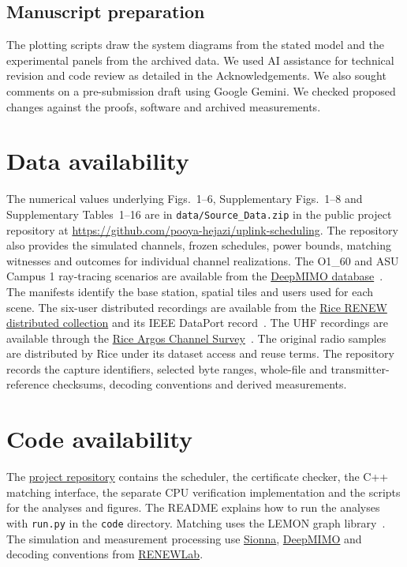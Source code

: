 \subsection*{Manuscript preparation}
The plotting scripts draw the system diagrams from the stated model and the experimental panels from the archived data. We used AI assistance for technical revision and code review as detailed in the Acknowledgements. We also sought comments on a pre-submission draft using Google Gemini. We checked proposed changes against the proofs, software and archived measurements.

\section*{Data availability}
The numerical values underlying Figs.~1--6, Supplementary Figs.~1--8 and Supplementary Tables~1--16 are in \nolinkurl{data/Source_Data.zip} in the public project repository at \url{https://github.com/pooya-hejazi/uplink-scheduling}. The repository also provides the simulated channels, frozen schedules, power bounds, matching witnesses and outcomes for individual channel realizations. The O1\_60 and ASU Campus 1 ray-tracing scenarios are available from the \href{https://www.deepmimo.net/}{DeepMIMO database}~\cite{deepmimo}. The manifests identify the base station, spatial tiles and users used for each scene. The six-user distributed recordings are available from the \href{https://renew.rice.edu/dataset-distributed.html}{Rice RENEW distributed collection} and its IEEE DataPort record~\cite{zafari}. The UHF recordings are available through the \href{https://renew.rice.edu/dataset-argos.html}{Rice Argos Channel Survey}~\cite{shepard}. The original radio samples are distributed by Rice under its dataset access and reuse terms. The repository records the capture identifiers, selected byte ranges, whole-file and transmitter-reference checksums, decoding conventions and derived measurements.


\section*{Code availability}
The \href{https://github.com/pooya-hejazi/uplink-scheduling}{project repository} contains the scheduler, the certificate checker, the C++ matching interface, the separate CPU verification implementation and the scripts for the analyses and figures. The README explains how to run the analyses with \texttt{run.py} in the \texttt{code} directory. Matching uses the LEMON graph library~\cite{lemon}. The simulation and measurement processing use \href{https://github.com/NVlabs/sionna}{Sionna}, \href{https://github.com/DeepMIMO/DeepMIMO}{DeepMIMO} and decoding conventions from \href{https://github.com/renew-wireless/RENEWLab}{RENEWLab}.

